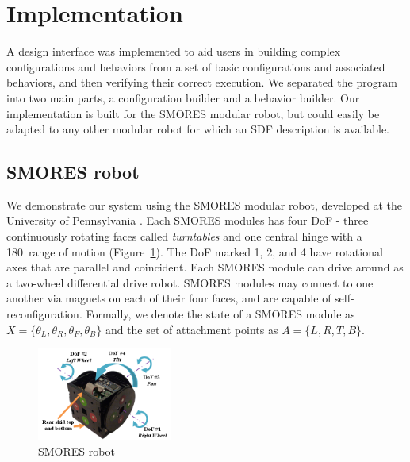 \documentclass[graybox]{svmult}
\newcommand{\TODO}[1]{ {\bf \textcolor{red}{TODO:} #1 }}
\begin{document}

\section{Implementation }
\label{sec:implementation}
A design interface was implemented to aid users in building complex configurations and behaviors from a set of basic configurations and associated behaviors,
and then verifying their correct execution. We separated the program into two main parts, a configuration builder and a behavior builder.
Our implementation is built for the SMORES modular robot, but could easily be adapted
to any other modular robot for which an SDF description is available. \subsection{SMORES robot}
We demonstrate our system using the SMORES modular robot, developed at the
University of Pennsylvania \cite{Davey2012}. Each SMORES modules has four DoF
- three continuously rotating faces called {\em turntables} and one
central hinge with a 180\textdegree\ range of motion (Figure~\ref{fig:SmoresRobot}). The
DoF marked 1, 2, and 4 have rotational axes that are parallel and coincident.
Each SMORES module can drive around as a two-wheel differential
drive robot.
SMORES modules may connect to one another via magnets on each of their four
faces, and are capable of  self-reconfiguration.
Formally, we denote the state of a SMORES module as \(X=\lbrace \theta_L, \theta_R,
\theta_F, \theta_B \rbrace\) and the set of attachment points as \(A=\lbrace L,R,T,B \rbrace\).

\begin{figure}[tb]
  \sidecaption
  \includegraphics[height=1.2in]{images/smores_robot.png}
  \caption{SMORES robot}
  \label{fig:SmoresRobot}
\end{figure}
\end{document}
